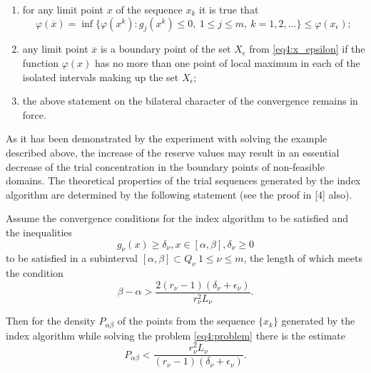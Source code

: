 \documentclass[graybox]{svmult}
\begin{document}
\begin{theorem}
\begin{enumerate}
    \item for any limit point $x$ of the sequence ${x_k}$ it is true that
    \begin{displaymath}
      \varphi(\overline x)=\inf\{\varphi(x^k):g_j(x^k)\le 0,\: 1\le j\le m,\: k=1,2,\dots\}\le\varphi(x_\epsilon);
    \end{displaymath}
    \item any limit point $\overline x$ is a boundary point of the set $X_\epsilon$ from \eqref{eq4:x_epsilon} if the function $\varphi(x)$ has no more than one point of local maximum in each of the isolated intervals making up the set $X_\epsilon$;
    \item the above statement on the bilateral character of the convergence remains in force.
  \end{enumerate}
\end{theorem}

As it has been demonstrated by the experiment with solving the example described above, the increase of the reserve values may result in an essential decrease of the trial concentration in the boundary points of non-feasible domains. The theoretical properties of the trial sequences generated by the index algorithm are determined by the following statement (see the proof in \cite{}[4] also).
\begin{theorem}
  Assume the convergence conditions for the index algorithm to be satisfied and the inequalities
  \begin{displaymath}
    g_\nu(x)\ge\delta_\nu,x\in[\alpha,\beta],\delta_\nu\ge 0
  \end{displaymath}
  to be satisfied in a subinterval $[\alpha,\beta]\subset Q_\nu \: 1\le\nu\le m$, the length of which meets the condition
  \begin{displaymath}
    \beta-\alpha>\frac{2(r_\nu-1)(\delta_\nu+\epsilon_\nu)}{r^2_\nu L_\nu}.
  \end{displaymath}

  Then for the density $P_{\alpha\beta}$ of the points from the sequence $\{x_k\}$ generated by the index algorithm while solving the problem \eqref{eq4:problem} there is the estimate
  \begin{displaymath}
    P_{\alpha\beta}<\frac{r^2_\nu L_\nu}{(r_\nu-1)(\delta_\nu+\epsilon_\nu)}.
  \end{displaymath}
\end{theorem}
\end{document}
